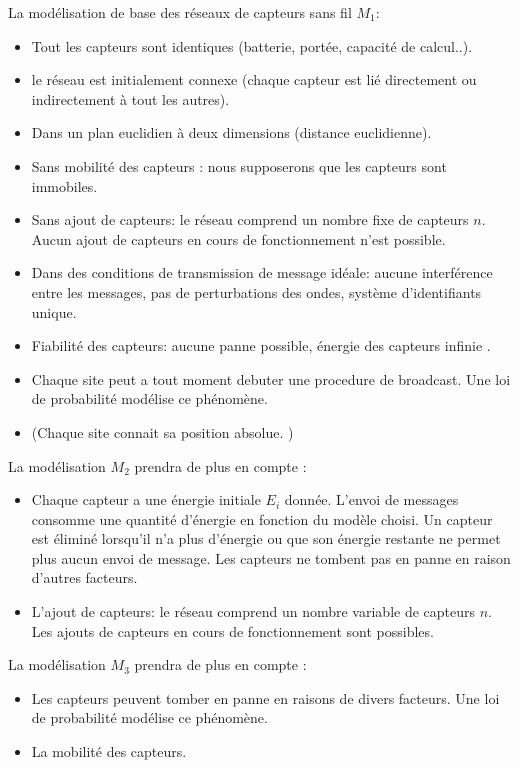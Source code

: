 La modélisation de base des réseaux de capteurs sans fil \textbf{$M_1$}:
\begin{itemize}
 \item Tout les capteurs sont identiques (batterie, portée, capacité de calcul..).
 \item le réseau est initialement connexe (chaque capteur est lié directement ou indirectement à tout les autres).
 \item Dans un plan euclidien à deux dimensions (distance euclidienne).
 \item Sans mobilité des capteurs : nous supposerons que les capteurs sont immobiles.
 \item Sans ajout de capteurs: le réseau comprend un nombre fixe de capteurs $n$. Aucun ajout de capteurs en cours de fonctionnement n'est possible.
 \item Dans des conditions de transmission de message idéale: aucune interférence entre les messages, pas de perturbations des ondes, système d'identifiants unique.
 \item Fiabilité des capteurs: aucune panne possible, énergie des capteurs infinie .
 \item Chaque site peut a tout moment debuter une procedure de broadcast. Une loi de probabilité modélise ce phénomène.
 \item (Chaque site connait sa position absolue. ) \\
\end{itemize}

  La modélisation \textbf{$M_2$} prendra de plus en compte :
  
\begin{itemize}
 \item Chaque capteur a une énergie initiale $E_i$ donnée. L'envoi de messages consomme une quantité d'énergie en fonction du modèle choisi. Un capteur est éliminé lorsqu'il n'a plus d'énergie ou que son énergie restante ne permet plus aucun envoi de message. Les capteurs ne tombent pas en panne en raison d'autres facteurs.   
 \item L'ajout de capteurs: le réseau comprend un nombre variable de capteurs $n$. Les ajouts de capteurs en cours de fonctionnement sont possibles.\\
 
\end{itemize}

La modélisation \textbf{$M_3$} prendra de plus en compte :

\begin{itemize}
 \item Les capteurs peuvent tomber en panne en raisons de divers facteurs. Une loi de probabilité modélise ce phénomène.   
 \item La mobilité des capteurs.\\
 
\end{itemize}


